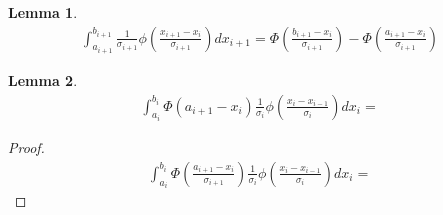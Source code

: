\documentclass{article}
\newtheorem{lemma}{Lemma}
\begin{document}
\begin{lemma}
  \begin{eqnarray*}
    \int_{a_{i+1}}^{b_{i+1}} \frac{1}{\sigma_{i+1}}\phi\left( \frac{x_{i+1} - x_i}{\sigma_{i+1}} \right) d\!x_{i+1} = \Phi\left(\frac{b_{i+1} - x_i}{\sigma_{i+1}}\right) - \Phi\left(\frac{a_{i+1} - x_i}{\sigma_{i+1}}\right)
  \end{eqnarray*}
\end{lemma}

\begin{lemma}
  \begin{eqnarray*}
    \int_{a_i}^{b_i} \Phi\left( a_{i+1} - x_i \right) \frac{1}{\sigma_i} \phi\left(\frac{x_i - x_{i-1}}{\sigma_i}\right) d\!x_i = 
  \end{eqnarray*}
\end{lemma}
\begin{proof}
  \begin{eqnarray*}
    \int_{a_i}^{b_i} \Phi\left( \frac{a_{i+1} - x_i}{\sigma_{i+1}} \right) \frac{1}{\sigma_i} \phi\left(\frac{x_i - x_{i-1}}{\sigma_i}\right) d\!x_i =
  \end{eqnarray*}
\end{proof}
\end{document}
